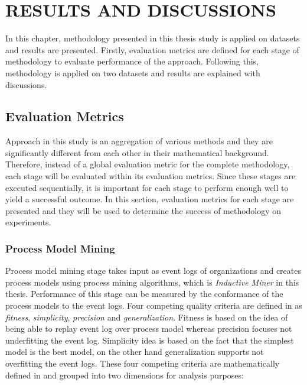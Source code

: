 \chapter{RESULTS AND DISCUSSIONS}
\label{chp:results-and-discussions}

In this chapter, methodology presented in this thesis study is applied on datasets and results are presented. Firstly, evaluation metrics are defined for each stage of methodology to evaluate performance of the approach. Following this, methodology is applied on two datasets and results are explained with discussions.

\section{Evaluation Metrics}
\label{sec:evaluation-metrics}
Approach in this study is an aggregation of various methods and they are significantly different from each other in their mathematical background. Therefore, instead of a global evaluation metric for the complete methodology, each stage will be evaluated within its evaluation metrics. Since these stages are executed sequentially, it is important for each stage to perform enough well to yield a successful outcome. In this section, evaluation metrics for each stage are presented and they will be used to determine the success of methodology on experiments.

\subsection{Process Model Mining}
\label{subsec:process-model-mining-eval}
Process model mining stage takes input as event logs of organizations and creates process models using process mining algorithms, which is \textit{Inductive Miner}\cite{leemans2014discoveringinfrequent} in this thesis. Performance of this stage can be measured by the conformance of the process models to the event logs. Four competing quality criteria are defined in \cite{van2011process} as \textit{fitness}, \textit{simplicity}, \textit{precision} and \textit{generalization}. Fitness is based on the idea of being able to replay event log over process model whereas precision focuses not underfitting the event log. Simplicity idea is based on the fact that the simplest model is the best model, on the other hand generalization supports not overfitting the event logs. These four competing criteria are mathematically defined in \cite{rozinat2008conformance} and grouped into two dimensions for analysis purposes:

